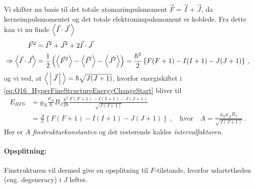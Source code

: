 Vi skifter nu basis til det totale atomarimpulsmoment $\vec{F} = \vec{I} + \vec{J}$, da kerneimpulsmomentet og det totale elektronimpulsmoment er koblede. Fra dette kan vi nu finde $\Braket{\vec{I} \cdot \vec{J} \:}$
\begin{align}
    \Vec{F}^2 &= \Vec{I}^2 + \Vec{J}^2 + 2\Vec{I} \cdot \Vec{J} \nonumber\\
    \Rightarrow \Braket{\Vec{I} \cdot \Vec{J}} &= \frac{1}{2} \left(\Braket{\Vec{F}^2} - \Braket{\Vec{I}^2} - \Braket{\Vec{J}^2}\right) = \frac{\hbar^2}{2} \left\{F(F+1) - I(I+1) - J(J+1)\right\} \: ,
\end{align}
og vi ved, at $\Braket{|\vec{J}|} = \hbar \sqrt{J(J+1)}$, hvorfor energiskiftet i \cref{eq:Q16_HyperFineStructureEnergyChangeStart} bliver til
\begin{align} \label{eq:Q16_HyperFineStructureEnergyChange}
    E_{HFS} &= g_N \frac{\mu_N}{\hbar} B_J \frac{\hbar^2}{2\hbar} \frac{F(F+1) - I(I+1) - J(J+1)}{\sqrt{J(J+1)}} \nonumber\\
    &= \frac{A}{2}\left\{F(F+1) - I(I+1) - J(J+1)\right\} \: , \quad \text{hvor} \quad A = \frac{g_N \mu_N B_J}{\sqrt{J(J+1)}} \: .
\end{align}
Her er $A$ \emph{finstrukturkonstanten} og det resterende kaldes \emph{intervalfaktoren}.


\paragraph{Opsplitning:} Finstrukturen vil dermed give en opsplitning til $F$-tilstande, hvorfor udartetheden (eng. degeneracy) i $J$ løftes.\\

